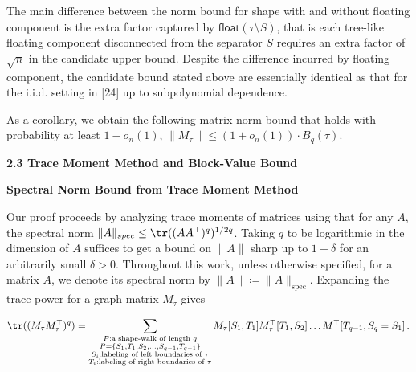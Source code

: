 The main difference between the norm bound for shape with and without floating component is the extra factor captured by $\mathsf{float}(\tau\setminus S)$, that is each tree-like floating component disconnected from the separator $S$ requires an extra factor of $\sqrt{n}$ in the candidate upper bound. Despite the difference incurred by floating component, the candidate bound stated above are essentially identical as that for the i.i.d. setting in [24] up to subpolynomial dependence.\par




As a corollary, we obtain the following matrix norm bound that holds with probability at least $1-o_{n}(1)$, $\|M_{\tau}\|\leq(1+o_{n}(1))\cdot B_{q}(\tau)$.\par





\par\medskip\noindent\textbf{
2.3 Trace Moment Method and Block-Value Bound}\par




\par\medskip\noindent\textbf{Spectral Norm Bound from Trace Moment Method}\par




Our proof proceeds by analyzing trace moments of matrices using that for any $A$, the spectral norm $\|A\|_{spec}\leq\tr((AA^{\top})^{q})^{1/2q}$. Taking $q$ to be logarithmic in the dimension of $A$ suffices to get a bound on $\|A\|$ sharp up to $1+\delta$ for an arbitrarily small $\delta>0$. Throughout this work, unless otherwise specified, for a matrix $A$, we denote its spectral norm by $\|A\|\coloneqq\|A\|_{\text{spec}}$. Expanding the trace power for a graph matrix $M_{\tau}$ gives\par




\[\begin{gathered}
\displaystyle\tr((M_{\tau}M_{\tau}^{\top})^{q}) \displaystyle=\sum_{\begin{subarray}{c}P:\text{a shape-walk of length }q\\
P=\{S_{1},T_{1},S_{2},\dots,S_{q-1},T_{q-1}\}\\
S_{i}:\text{labeling of left boundaries of $\tau$}\\
T_{i}:\text{labeling of right boundaries of $\tau$}\end{subarray}}M_{\tau}[S_{1},T_{1}]M_{\tau}^{\top}[T_{1},S_{2}]\dots M^{\top}[T_{q-1},S_{q}=S_{1}]\,.
\end{gathered}\]




